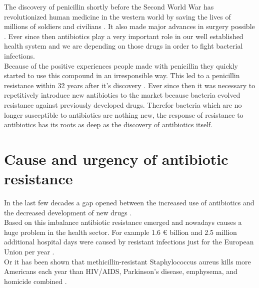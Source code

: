 The discovery of penicillin shortly before the Second World War has revolutionized human medicine in the western world by saving the lives of millions of soldiers and civilians \cite{cdc_biggest_2019}. It also made major advances in surgery possible \cite{worldwar_resistance}. Ever since then antibiotics play a very important role in our well established health system and we are depending on those drugs in order to fight bacterial infections.\\
Because of the positive experiences people made with penicillin they quickly started to use this compound in an irresponsible way. This led to a penicillin resistance within 32 years after it's discovery \cite{worldwar_resistance}.
Ever since then it was necessary to repetitively introduce new antibiotics to the market because bacteria evolved resistance against previously developed drugs. Therefor bacteria which are no longer susceptible to antibiotics are nothing new, the response of resistance to antibiotics has its roots as deep as the discovery of antibiotics itself. 

\section{Cause and urgency of antibiotic resistance}
In the last few decades a gap opened between the increased use of antibiotics and the decreased development of new drugs \cite{ventola_antibiotic_2015}.\\
Based on this imbalance antibiotic resistance emerged and nowadays causes a huge problem in the health sector.  
For example 1.6 € billion and 2.5 million additional hospital days were caused by resistant infections just for the European Union per year \cite{europaisches_zentrum_fur_die_pravention_und_die_kontrolle_von_krankheiten_bacterial_2009}. \\
Or it has been shown that methicillin-resistant Staphylococcus aureus kills more Americans each year than HIV/AIDS, Parkinson’s disease, emphysema, and homicide combined \cite{ventola_antibiotic_2015}.

